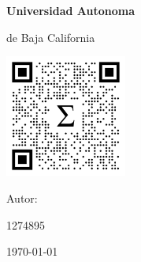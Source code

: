 \documentclass[11pt]{article}
\author{Galindo}
\date{\today}
\title{}
\begin{document}
\pagestyle{fancy}
\fancyhf{}
\cfoot{\thepage}


\begin{titlepage}
\centering
{\bfseries\LARGE Universidad Autonoma \par de Baja California \par}
\vfill
{\scshape\Huge \@title \par}
\vfill
\begin{center}
\includegraphics[width=4cm]{./0imports/img/eigen}
\end{center}
\vfill
{\Large Autor: \par}
{\Large \@author \par}
1274895
\vfill
{\Large \today \par}
\end{titlepage}
\end{document}

